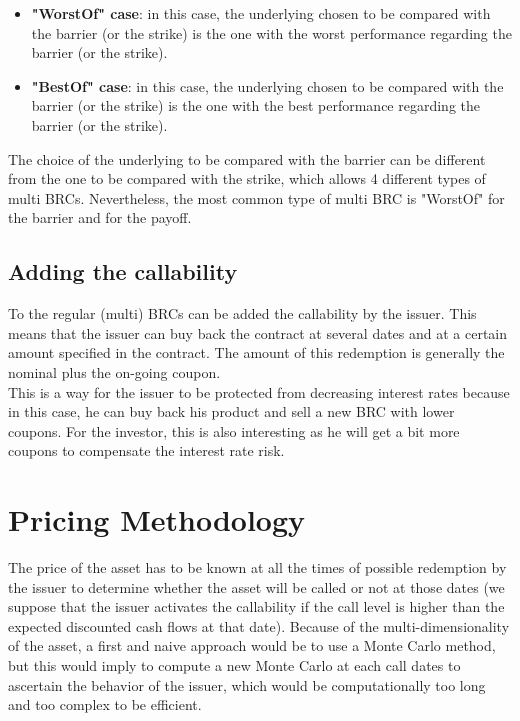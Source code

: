 \documentclass[a4paper,11pt,english]{book}
\begin{document}
\begin{itemize}
    \item \textbf{"WorstOf" case}: in this case, the underlying chosen to be compared with the barrier (or the strike) is the one with the worst performance regarding the barrier (or the strike).
    \item \textbf{"BestOf" case}: in this case, the underlying chosen to be compared with the barrier (or the strike) is the one with the best performance regarding the barrier (or the strike).
\end{itemize}

The choice of the underlying to be compared with the barrier can be different from the one to be compared with the strike, which allows 4 different types of multi BRCs. Nevertheless, the most common type of multi BRC is "WorstOf" for the barrier and for the payoff. 

\section{Adding the callability}
To the regular (multi) BRCs can be added the callability by the issuer. This means that the issuer can buy back the contract at several dates and at a certain amount specified in the contract. The amount of this redemption is generally the nominal plus the on-going coupon.\\

This is a way for the issuer to be protected from decreasing interest rates because in this case, he can buy back his product and sell a new BRC with lower coupons. For the investor, this is also interesting as he will get a bit more coupons to compensate the interest rate risk.


\pagestyle{fancy}

\chapter{Pricing Methodology}
\label{chap:pricing-methodology}
The price of the asset has to be known at all the times of possible redemption by the issuer to determine whether the asset will be called or not at those dates (we suppose that the issuer activates the callability if the call level is higher than the expected discounted cash flows at that date). Because of the multi-dimensionality of the asset, a first and naive approach would be to use a Monte Carlo method, but this would imply to compute a new Monte Carlo at each call dates to ascertain the behavior of the issuer, which would be computationally too long and too complex to be efficient. 
\end{document}
